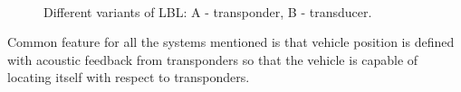 \begin{figure}%
  \begin{center}
       \\
  \end{center}
  \caption{Different variants of LBL: A - transponder, B - transducer.}
  \vspace{-10pt}
  \label{fig:lbl}
\end{figure}
Common feature for all the systems mentioned is that vehicle position is defined with acoustic feedback from transponders so that the vehicle is capable of locating itself with respect to transponders.

